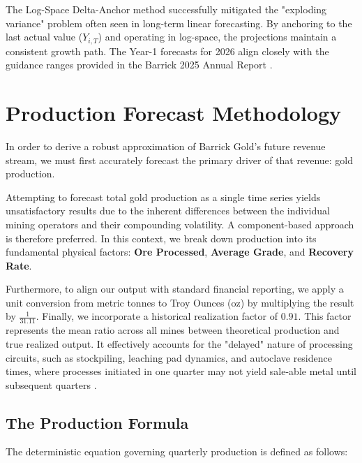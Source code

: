 



The Log-Space Delta-Anchor method successfully mitigated the "exploding variance" problem often seen in long-term linear forecasting. By anchoring to the last actual value ($Y_{i,T}$) and operating in log-space, the projections maintain a consistent growth path. The Year-1 forecasts for 2026 align closely with the guidance ranges provided in the Barrick 2025 Annual Report .


\section{Production Forecast Methodology}

In order to derive a robust approximation of Barrick Gold's future revenue stream, we must first accurately forecast the primary driver of that revenue: gold production. 

Attempting to forecast total gold production as a single time series yields unsatisfactory results due to the inherent differences between the individual mining operators and their compounding volatility. A component-based approach is therefore preferred. In this context, we break down production into its fundamental physical factors: \textbf{Ore Processed}, \textbf{Average Grade}, and \textbf{Recovery Rate}. 

Furthermore, to align our output with standard financial reporting, we apply a unit conversion from metric tonnes to Troy Ounces (oz) by multiplying the result by $\frac{1}{31.11}$. Finally, we incorporate a historical realization factor of $0.91$. This factor represents the mean ratio across all mines between theoretical production and true realized output. It effectively accounts for the "delayed" nature of processing circuits, such as stockpiling, leaching pad dynamics, and autoclave residence times, where processes initiated in one quarter may not yield sale-able metal until subsequent quarters .
\subsection{The Production Formula}
The deterministic equation governing quarterly production is defined as follows:


